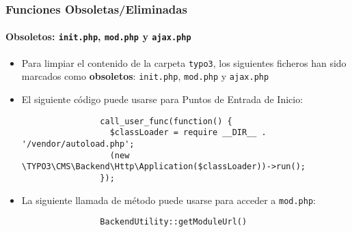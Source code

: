 \begin{frame}[fragile]
	\frametitle{Funciones Obsoletas/Eliminadas}
	\framesubtitle{Obsoletos: \texttt{init.php}, \texttt{mod.php} y \texttt{ajax.php}}


	\begin{itemize}

		\item Para limpiar el contenido de la carpeta \texttt{typo3}, los siguientes ficheros han
			sido marcados como \textbf{obsoletos}: \texttt{init.php}, \texttt{mod.php} y \texttt{ajax.php}

		\item El siguiente código puede usarse para Puntos de Entrada de Inicio:

			\begin{lstlisting}
				call_user_func(function() {
				  $classLoader = require __DIR__ . '/vendor/autoload.php';
				  (new \TYPO3\CMS\Backend\Http\Application($classLoader))->run();
				});
			\end{lstlisting}

		\item La siguiente llamada de método puede usarse para acceder a \texttt{mod.php}:

			\begin{lstlisting}
				BackendUtility::getModuleUrl()
			\end{lstlisting}

	\end{itemize}

\end{frame}


